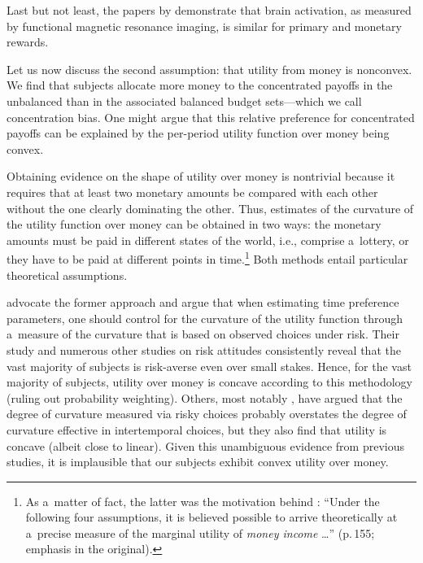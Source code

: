 Last but not least, the papers by \cite{McClure2004a, McClure2007} demonstrate that brain activation, as measured by functional magnetic resonance imaging, is similar for primary and monetary rewards.

Let us now discuss the second assumption: that utility from money is nonconvex. We find that subjects allocate more money to the concentrated payoffs in the unbalanced than in the associated balanced budget sets---which we call concentration bias. One might argue that this relative preference for concentrated payoffs can be explained by the per-period utility function over money being convex.

Obtaining evidence on the shape of utility over money is nontrivial because it requires that at least two monetary amounts be compared with each other without the one clearly dominating the other. Thus, estimates of the curvature of the utility function over money can be obtained in two ways: the monetary amounts must be paid in different states of the world, i.e., comprise a~lottery, or they have to be paid at different points in time.\footnote{As a~matter of fact, the latter was the motivation behind \cite{Samuelson1937}: ``Under the following four assumptions, it is believed possible to arrive theoretically at a~precise measure of the marginal utility of \textit{money income} \dots'' (p.\,155; emphasis in the original).} Both methods entail particular theoretical assumptions.

\cite{Andersen2008} advocate the former approach and argue that when estimating time preference parameters, one should control for the curvature of the utility function through a~measure of the curvature that is based on observed choices under risk. Their study and numerous other studies on risk attitudes consistently reveal that the vast majority of subjects is risk-averse even over small stakes. Hence, for the vast majority of subjects, utility over money is concave according to this methodology (ruling out probability weighting). Others, most notably \cite{Andreoni2012}, have argued that the degree of curvature measured via risky choices probably overstates the degree of curvature effective in intertemporal choices, but they also find that utility is concave (albeit close to linear). Given this unambiguous evidence from previous studies, it is implausible that our subjects exhibit convex utility over money.